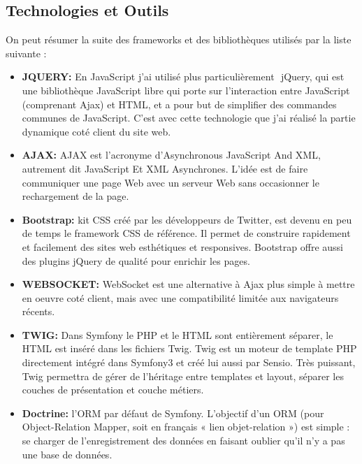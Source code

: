 \documentclass[12pt]{article}
\begin{document}
\subsection{Technologies et Outils}

On peut résumer la suite  des frameworks et des  bibliothèques utilisés  par la liste suivante :
\begin{itemize}

\item \textbf{JQUERY:} En JavaScript j’ai utilisé plus particulièrement ​
jQuery, qui est une bibliothèque
JavaScript libre qui porte sur l'interaction entre JavaScript
(comprenant Ajax) et HTML, et a pour but de simplifier des
commandes communes de JavaScript. C’est avec cette technologie que j’ai réalisé la partie dynamique coté client du site web.

\item \textbf{AJAX:} AJAX est l'acronyme d'Asynchronous JavaScript And XML, autrement dit JavaScript Et XML Asynchrones.
L'idée  est de faire communiquer une page Web avec un serveur Web sans occasionner le rechargement de la page. 

\item \textbf{Bootstrap:} kit CSS créé par les développeurs de Twitter, est devenu en peu de temps le framework CSS de référence. Il permet de  construire rapidement et facilement des sites web esthétiques et responsives. Bootstrap offre aussi des plugins jQuery de qualité pour enrichir les pages.

\item \textbf{WEBSOCKET:} WebSocket est une alternative à Ajax plus simple à mettre en oeuvre coté client, mais avec une compatibilité limitée aux navigateurs récents.

\item \textbf{TWIG:} Dans Symfony le PHP et le HTML sont entièrement séparer, le HTML est inséré
dans les fichiers Twig. Twig est un moteur de template PHP
directement intégré dans Symfony3 et créé lui aussi par Sensio. Très
puissant, Twig permettra de gérer de l’héritage entre templates et
layout, séparer les couches de présentation et couche métiers.

\item \textbf{Doctrine: } l'ORM par défaut de Symfony. L'objectif d'un ORM (pour Object-Relation Mapper, soit en français « lien objet-relation ») est simple : se charger de l'enregistrement des données en  faisant oublier qu'il n'y a pas  une base de données.

\end{itemize}
\\ 
\\
\end{document}
